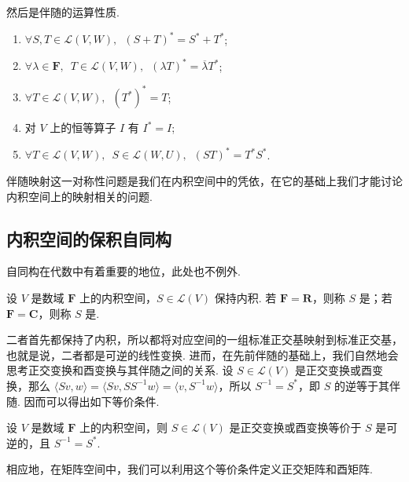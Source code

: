 然后是伴随的运算性质.

\begin{enumerate}
    \item $ \forall S, T \in \mathcal{L}(V, W),\enspace (S + T)^* = S^* + T^* $;

    \item $ \forall \lambda \in \mathbf{F},\enspace T \in \mathcal{L}(V, W),\enspace (\lambda T)^* = \overline{\lambda} T^* $;

    \item $ \forall T \in \mathcal{L}(V, W),\enspace (T^*)^* = T $;

    \item 对 $ V $ 上的恒等算子 $ I $ 有 $ I^* = I $;

    \item $ \forall T \in \mathcal{L}(V, W),\enspace S \in \mathcal{L}(W, U),\enspace (ST)^* = T^*S^* $.
\end{enumerate}

伴随映射这一对称性问题是我们在内积空间中的凭依，在它的基础上我们才能讨论内积空间上的映射相关的问题.

\subsection{内积空间的保积自同构}

自同构在代数中有着重要的地位，此处也不例外.

\begin{definition}
    设 $ V $ 是数域 $ \mathbf{F} $ 上的内积空间，$ S \in \mathcal{L}(V) $ 保持内积. 若 $ \mathbf{F} = \mathbf{R} $，则称 $ S $ 是；若 $ \mathbf{F} = \mathbf{C} $，则称 $ S $ 是.
\end{definition}

二者首先都保持了内积，所以都将对应空间的一组标准正交基映射到标准正交基，也就是说，二者都是可逆的线性变换. 进而，在先前伴随的基础上，我们自然地会思考正交变换和酉变换与其伴随之间的关系. 设 $ S \in \mathcal{L}(V) $ 是正交变换或酉变换，那么 $ \langle Sv, w \rangle = \langle Sv, SS^{-1} w \rangle = \langle v, S^{-1}w \rangle $，所以 $ S^{-1} = S^* $，即 $ S $ 的逆等于其伴随. 因而可以得出如下等价条件.

\begin{theorem}
    设 $ V $ 是数域 $ \mathbf{F} $ 上的内积空间，则 $ S \in \mathcal{L}(V) $ 是正交变换或酉变换等价于 $ S $ 是可逆的，且 $ S^{-1} = S^* $.
\end{theorem}

相应地，在矩阵空间中，我们可以利用这个等价条件定义正交矩阵和酉矩阵.

